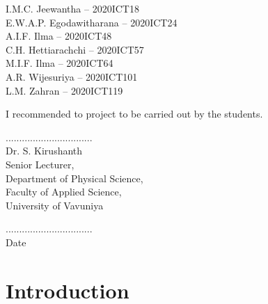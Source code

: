 \documentclass[12pt]{article}
\begin{document}
\noindent
\begin{tabbing}
    I.M.C. Jeewantha – 2020ICT18 \hspace{3cm} \= \underline{\hspace{4cm}} \\
    E.W.A.P. Egodawitharana – 2020ICT24 \> \underline{\hspace{4cm}} \\
    A.I.F. Ilma – 2020ICT48 \> \underline{\hspace{4cm}} \\
    C.H. Hettiarachchi – 2020ICT57 \> \underline{\hspace{4cm}} \\
    M.I.F. Ilma – 2020ICT64 \> \underline{\hspace{4cm}} \\
    A.R. Wijesuriya – 2020ICT101 \> \underline{\hspace{4cm}} \\
    L.M. Zahran – 2020ICT119 \> \underline{\hspace{4cm}}
\end{tabbing}
\vspace{2in}

I recommended to project to be carried out by the students.\\

\vspace{0.6in}

\begin{minipage}[t]{0.6\textwidth}
    ................................ \\ 
    Dr. S. Kirushanth \\ 
    Senior Lecturer, \\ 
    Department of Physical Science, \\ 
    Faculty of Applied Science, \\ 
    University of Vavuniya
\end{minipage}%
\begin{minipage}[t]{0.3\textwidth}
    \centering
     ................................ \\ 
    Date
\end{minipage}

\newpage

\tableofcontents

\newpage

\section{Introduction}
\justifying
\end{document}
